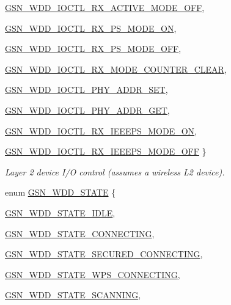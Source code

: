 \begin{DoxyCompactItemize}
\hyperlink{a00670_ggaf67ac3e77c7a5742b9b0bc7672529533aff1d4dffa5b49df8c650ace2823be8b1}{GSN\_\-WDD\_\-IOCTL\_\-RX\_\-ACTIVE\_\-MODE\_\-OFF}, 
\par
\hyperlink{a00670_ggaf67ac3e77c7a5742b9b0bc7672529533a4eadb52c59da5af23a4976dca90f2d73}{GSN\_\-WDD\_\-IOCTL\_\-RX\_\-PS\_\-MODE\_\-ON}, 
\par
\hyperlink{a00670_ggaf67ac3e77c7a5742b9b0bc7672529533ac24a8e559457d883784645d80c09d27d}{GSN\_\-WDD\_\-IOCTL\_\-RX\_\-PS\_\-MODE\_\-OFF}, 
\par
\hyperlink{a00670_ggaf67ac3e77c7a5742b9b0bc7672529533a8a81d1c493fdcdc77180b01c800a206a}{GSN\_\-WDD\_\-IOCTL\_\-RX\_\-MODE\_\-COUNTER\_\-CLEAR}, 
\par
\hyperlink{a00670_ggaf67ac3e77c7a5742b9b0bc7672529533a36fc54ac07dd47f6d6b86b07a41ace72}{GSN\_\-WDD\_\-IOCTL\_\-PHY\_\-ADDR\_\-SET}, 
\par
\hyperlink{a00670_ggaf67ac3e77c7a5742b9b0bc7672529533a13b9b199720d5323049dc71fa3abbb0f}{GSN\_\-WDD\_\-IOCTL\_\-PHY\_\-ADDR\_\-GET}, 
\par
\hyperlink{a00670_ggaf67ac3e77c7a5742b9b0bc7672529533a37563cd4302ca3be0f252a5b431f807a}{GSN\_\-WDD\_\-IOCTL\_\-RX\_\-IEEEPS\_\-MODE\_\-ON}, 
\par
\hyperlink{a00670_ggaf67ac3e77c7a5742b9b0bc7672529533ad7bdc6ddeb1968420616edcb71644a66}{GSN\_\-WDD\_\-IOCTL\_\-RX\_\-IEEEPS\_\-MODE\_\-OFF}
 \}
\begin{DoxyCompactList}\small\item\em Layer 2 device I/O control (assumes a wireless L2 device). \end{DoxyCompactList}\item 
enum \hyperlink{a00677_ga235b17af49bd1a1dc55715a7809b24ff}{GSN\_\-WDD\_\-STATE} \{ \par
\hyperlink{a00677_gga235b17af49bd1a1dc55715a7809b24ffa85f6148682bde7eb370b55ad17044c93}{GSN\_\-WDD\_\-STATE\_\-IDLE}, 
\par
\hyperlink{a00677_gga235b17af49bd1a1dc55715a7809b24ffab9dfd40ad92dc407336914a170a14a5d}{GSN\_\-WDD\_\-STATE\_\-CONNECTING}, 
\par
\hyperlink{a00677_gga235b17af49bd1a1dc55715a7809b24ffa6c3a9720a310ff028b93050b034c3f6e}{GSN\_\-WDD\_\-STATE\_\-SECURED\_\-CONNECTING}, 
\par
\hyperlink{a00677_gga235b17af49bd1a1dc55715a7809b24ffa45ab3a36a018ce282732ef888382a6ed}{GSN\_\-WDD\_\-STATE\_\-WPS\_\-CONNECTING}, 
\par
\hyperlink{a00677_gga235b17af49bd1a1dc55715a7809b24ffa809d7f6973224af7492c48f3c4b7ca4c}{GSN\_\-WDD\_\-STATE\_\-SCANNING}, 

\end{DoxyCompactItemize}
